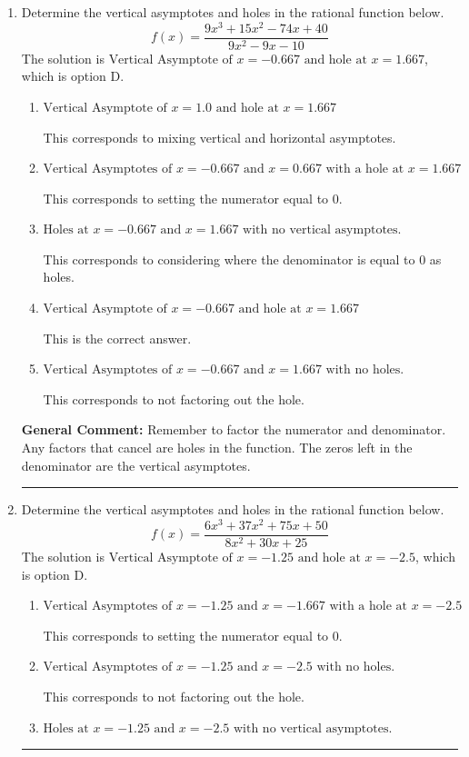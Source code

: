 \documentclass{extbook}[14pt]
\newcommand{\litem}[1]{\item #1

\rule{\textwidth}{0.4pt}}
\begin{document}
\begin{enumerate}\litem{
Determine the vertical asymptotes and holes in the rational function below.
\[ f(x) = \frac{9x^{3} +15 x^{2} -74 x + 40}{9x^{2} -9 x -10} \]The solution is \( \text{Vertical Asymptote of } x = -0.667 \text{ and hole at } x = 1.667 \), which is option D.\begin{enumerate}[label=\Alph*.]
\item \( \text{Vertical Asymptote of } x = 1.0 \text{ and hole at } x = 1.667 \)

This corresponds to mixing vertical and horizontal asymptotes.
\item \( \text{Vertical Asymptotes of } x = -0.667 \text{ and } x = 0.667 \text{ with a hole at } x = 1.667 \)

This corresponds to setting the numerator equal to 0.
\item \( \text{Holes at } x = -0.667 \text{ and } x = 1.667 \text{ with no vertical asymptotes.} \)

This corresponds to considering where the denominator is equal to 0 as holes.
\item \( \text{Vertical Asymptote of } x = -0.667 \text{ and hole at } x = 1.667 \)

This is the correct answer.
\item \( \text{Vertical Asymptotes of } x = -0.667 \text{ and } x = 1.667 \text{ with no holes.} \)

This corresponds to not factoring out the hole.
\end{enumerate}

\textbf{General Comment:} Remember to factor the numerator and denominator. Any factors that cancel are holes in the function. The zeros left in the denominator are the vertical asymptotes.
}
\litem{
Determine the vertical asymptotes and holes in the rational function below.
\[ f(x) = \frac{6x^{3} +37 x^{2} +75 x + 50}{8x^{2} +30 x + 25} \]The solution is \( \text{Vertical Asymptote of } x = -1.25 \text{ and hole at } x = -2.5 \), which is option D.\begin{enumerate}[label=\Alph*.]
\item \( \text{Vertical Asymptotes of } x = -1.25 \text{ and } x = -1.667 \text{ with a hole at } x = -2.5 \)

This corresponds to setting the numerator equal to 0.
\item \( \text{Vertical Asymptotes of } x = -1.25 \text{ and } x = -2.5 \text{ with no holes.} \)

This corresponds to not factoring out the hole.
\item \( \text{Holes at } x = -1.25 \text{ and } x = -2.5 \text{ with no vertical asymptotes.} \)


\end{enumerate}}
\end{enumerate}
\end{document}
